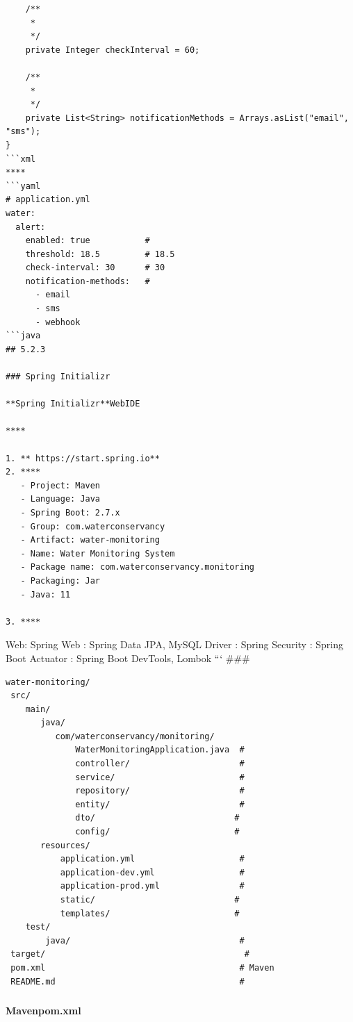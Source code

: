 \begin{verbatim}
    /**
     * 
     */
    private Integer checkInterval = 60;
    
    /**
     * 
     */
    private List<String> notificationMethods = Arrays.asList("email", "sms");
}
```xml
****
```yaml
# application.yml
water:
  alert:
    enabled: true           # 
    threshold: 18.5         # 18.5
    check-interval: 30      # 30
    notification-methods:   # 
      - email
      - sms
      - webhook
```java
## 5.2.3 

### Spring Initializr

**Spring Initializr**WebIDE

****

1. ** https://start.spring.io**
2. ****
   - Project: Maven
   - Language: Java
   - Spring Boot: 2.7.x
   - Group: com.waterconservancy
   - Artifact: water-monitoring
   - Name: Water Monitoring System
   - Package name: com.waterconservancy.monitoring
   - Packaging: Jar
   - Java: 11

3. ****
\end{verbatim}

Web: Spring Web : Spring Data JPA, MySQL Driver : Spring Security :
Spring Boot Actuator : Spring Boot DevTools, Lombok ``` \#\#\#

\begin{verbatim}
water-monitoring/
 src/
    main/
       java/
          com/waterconservancy/monitoring/
              WaterMonitoringApplication.java  # 
              controller/                      # 
              service/                         # 
              repository/                      # 
              entity/                          # 
              dto/                            # 
              config/                         # 
       resources/
           application.yml                     # 
           application-dev.yml                 # 
           application-prod.yml                # 
           static/                            # 
           templates/                         # 
    test/
        java/                                  # 
 target/                                        # 
 pom.xml                                       # Maven
 README.md                                     # 
\end{verbatim}

\subsubsection{}\label{section-18}

\textbf{Mavenpom.xml}

